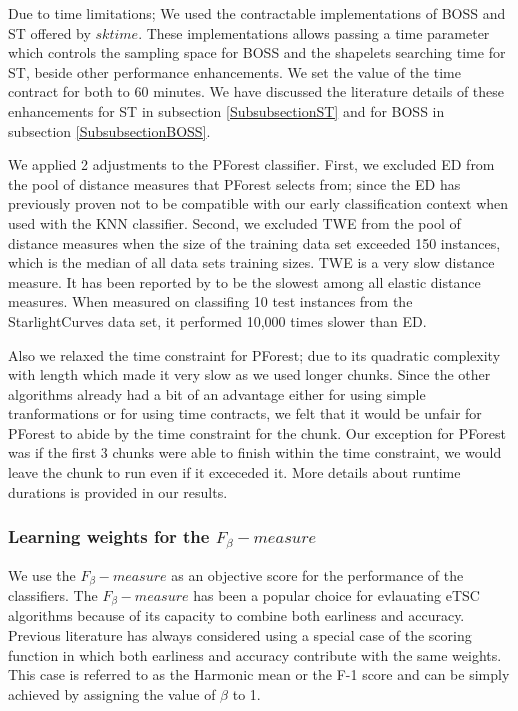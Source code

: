 Due to time limitations; We used the contractable implementations of BOSS and ST offered by $sktime$.
These implementations allows passing a time parameter which controls the sampling space for BOSS and the shapelets searching time for ST,
beside other performance enhancements.
We set the value of the time contract for both to 60 minutes.
We have discussed the literature details of these enhancements for ST in subsection \ref{SubsubsectionST} and for BOSS in subsection \ref{SubsubsectionBOSS}.

We applied 2 adjustments to the PForest classifier.
First, we excluded ED from the pool of distance measures that PForest selects from; since the ED has previously proven not to be compatible with our early classification context when used with the KNN classifier.
Second, we excluded TWE from the pool of distance measures when the size of the training data set exceeded 150 instances, which is the median of all data sets training sizes.
TWE is a very slow distance measure. It has been reported by \cite{bagnall2017great} to be the slowest among all elastic distance measures. When measured on classifing 10 test instances from the
StarlightCurves data set, it performed 10,000 times slower than ED.

Also we relaxed the time constraint for PForest; due to its quadratic complexity with length \cite{lucas2019proximity} which made it very slow as we used longer chunks.
Since the other algorithms already had a bit of an advantage either for using simple tranformations or for using time contracts,
we felt that it would be unfair for PForest to abide by the time constraint for the  chunk.
Our exception for PForest was if the first 3 chunks were able to finish within the time constraint, we would leave the  chunk to run even if it exceceded it.
More details about runtime durations is provided in our results.


\subsubsection{Learning weights for the $F_{\beta}-measure$}
\label{SubsubsectionLearningFBetaMeasure}
We use the $F_{\beta}-measure$ as an objective score for the performance of the classifiers.
The $F_{\beta}-measure$ has been a popular choice for evlauating eTSC algorithms \cite{schafer2020teaser} because of its
capacity to combine both earliness and accuracy.
Previous literature has always considered using a special case of the scoring function in which both earliness and accuracy contribute with the same weights.
This case is referred to as the Harmonic mean or the F-1 score and can be simply achieved by assigning the value of $\beta$ to 1.


